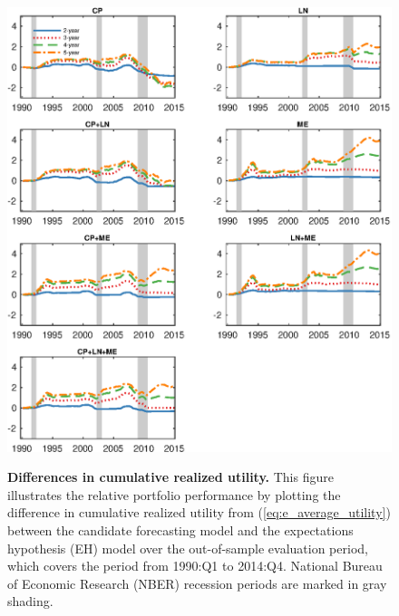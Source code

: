 \documentclass[12pt,a4paper,onecolumn,oneside,notitlepage]{article}
\begin{document}
\clearpage
\begin{figure}[htbp]
    \caption{
        \textbf{Differences in cumulative realized utility.} \newline
        This figure illustrates the relative portfolio performance by plotting the difference in cumulative realized utility from (\ref{eq:e_average_utility}) between the candidate forecasting model and the expectations hypothesis (EH) model  over the out-of-sample evaluation period, which covers the period from 1990:Q1 to 2014:Q4. National Bureau of Economic Research (NBER) recession periods are marked in gray shading.
    }
    \centering
    \includegraphics[scale=1]{Figures/e_dcutil.eps}
    \label{Fig:e_dcutil}
\end{figure}

\end{document}
